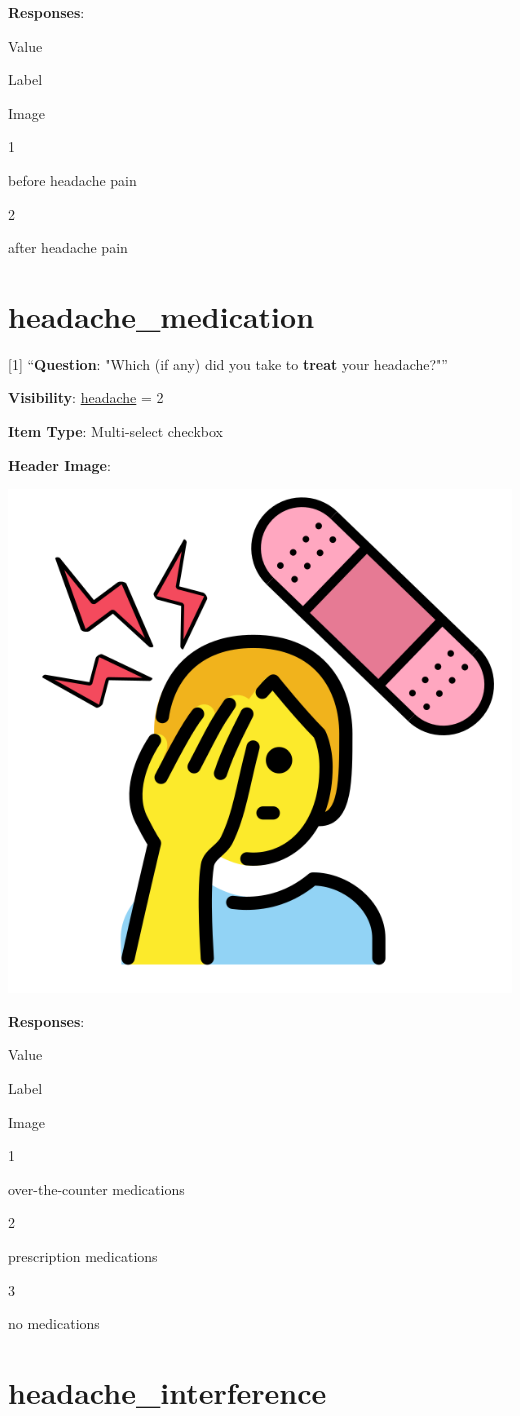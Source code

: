 \documentclass[]{book}
\begin{document}
\textbf{Responses}:

Value

Label

Image

1

before headache pain

2

after headache pain

\hypertarget{headache_medication}{%
\section{headache\_medication}\label{headache_medication}}

{[}1{]} ``\textbf{Question}: "Which (if any) did you take to \textbf{treat} your headache?"''

\textbf{Visibility}: \protect\hyperlink{headache}{headache} = 2

\textbf{Item Type}: Multi-select checkbox

\textbf{Header Image}:

\begin{flushleft}\includegraphics[width=0.33\linewidth]{downloadFigs4latex_NIMH_Applet_Codebook/headache_medication_headerImg} \end{flushleft}

\textbf{Responses}:

Value

Label

Image

1

over-the-counter medications

2

prescription medications

3

no medications

\hypertarget{headache_interference}{%
\section{headache\_interference}\label{headache_interference}}
\end{document}
